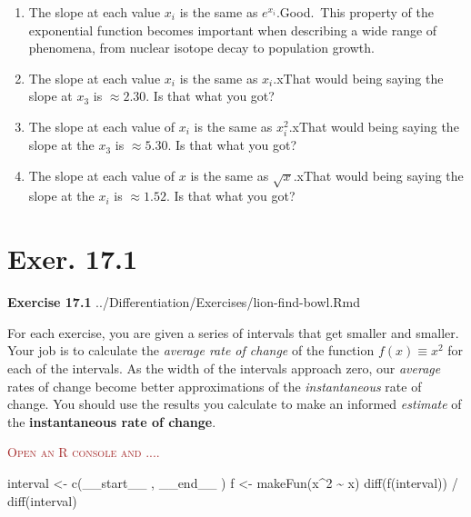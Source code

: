 \documentclass[
  letterpaper,
  DIV=11,
  numbers=noendperiod,
  oneside]{article}
\newenvironment{Shaded}{\begin{snugshade}}{\end{snugshade}}
\newcommand{\DecValTok}[1]{\textcolor[rgb]{0.68,0.00,0.00}{#1}}
\newcommand{\FunctionTok}[1]{\textcolor[rgb]{0.28,0.35,0.67}{#1}}
\newcommand{\NormalTok}[1]{\textcolor[rgb]{0.00,0.23,0.31}{#1}}
\newcommand{\OtherTok}[1]{\textcolor[rgb]{0.00,0.23,0.31}{#1}}
\newcommand{\SpecialCharTok}[1]{\textcolor[rgb]{0.37,0.37,0.37}{#1}}
\providecommand{\tightlist}{%
  \setlength{\itemsep}{0pt}\setlength{\parskip}{0pt}}\usepackage{longtable,booktabs,array}
\newenvironment{scaffolding}%
{%
\textcolor{brown}{\hrulefill}%
  \par\vspace{.3\baselineskip}%
  \textcolor{brown}{\scshape Open an R console and ....}%
  \par\vspace{\baselineskip}%
}%
{\textcolor{brown}{\hrulefill}}
\begin{document}
\begin{multicols}{2}
\begin{enumerate}
\def\labelenumi{\roman{enumi}.}
\tightlist
\item
  {The slope at each value \(x_i\) is the same as
  \(e^{x_i}\).{Good.~This property of the exponential function becomes
  important when describing a wide range of phenomena, from nuclear
  isotope decay to population growth.}}\\
\item
  {The slope at each value \(x_i\) is the same as \(x_i\).{xThat would
  being saying the slope at \(x_3\) is \(\approx 2.30\). Is that what
  you got?}}\\
\item
  {The slope at each value of \(x_i\) is the same as \(x_i^2\).{xThat
  would being saying the slope at the \(x_3\) is \(\approx 5.30\). Is
  that what you got?}}\\
\item
  {The slope at each value of \(x\) is the same as \(\sqrt{x}.\){xThat
  would being saying the slope at the \(x_i\) is \(\approx 1.52\). Is
  that what you got?}}
\end{enumerate}

\hypertarget{exer.-17.1}{%
\section*{Exer. 17.1}\label{exer.-17.1}}

\textbf{Exercise 17.1} ../Differentiation/Exercises/lion-find-bowl.Rmd

For each exercise, you are given a series of intervals that get smaller
and smaller. Your job is to calculate the \emph{average rate of change}
of the function \(f(x) \equiv x^2\) for each of the intervals. As the
width of the intervals approach zero, our \emph{average} rates of change
become better approximations of the \emph{instantaneous} rate of change.
You should use the results you calculate to make an informed
\emph{estimate} of the \textbf{instantaneous rate of change}.

\begin{scaffolding}

\begin{Shaded}
\begin{Highlighting}[]
\NormalTok{interval }\OtherTok{\textless{}{-}} \FunctionTok{c}\NormalTok{(\_\_start\_\_ , \_\_end\_\_ )}
\NormalTok{f }\OtherTok{\textless{}{-}} \FunctionTok{makeFun}\NormalTok{(x}\SpecialCharTok{\^{}}\DecValTok{2} \SpecialCharTok{\textasciitilde{}}\NormalTok{ x)}
\FunctionTok{diff}\NormalTok{(}\FunctionTok{f}\NormalTok{(interval)) }\SpecialCharTok{/} \FunctionTok{diff}\NormalTok{(interval)}
\end{Highlighting}
\end{Shaded}


\end{scaffolding}
\end{multicols}
\end{document}
